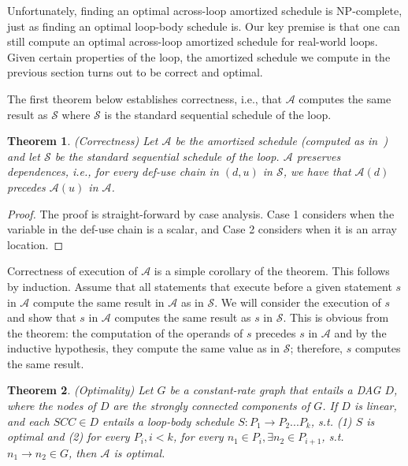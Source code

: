 \documentclass[sigconf, screen, natbib=false, dvipsnames, table]{acmart}
\newtheorem{theorem}{Theorem}
\theoremstyle{definition}
\begin{document}
Unfortunately, finding an optimal across-loop amortized schedule is NP-complete, just as finding an optimal loop-body schedule is.
Our key premise is that one can still compute an optimal across-loop amortized schedule for real-world loops. Given certain 
properties of the loop, the amortized schedule we compute in the previous section turns out to be correct and optimal. 

The first theorem below establishes correctness, i.e., that $\mathcal{A}$ computes the same result as $\mathcal{S}$ where
$\mathcal{S}$ is the standard sequential schedule of the loop. 

\begin{theorem}(Correctness)
Let $\mathcal{A}$ be the amortized schedule (computed as in~) and let $\mathcal{S}$ be the standard sequential 
schedule of the loop. $\mathcal{A}$ preserves dependences, i.e., for every def-use chain in $(d,u)$ in $\mathcal{S}$, we have that
$\mathcal{A}(d)$ precedes $\mathcal{A}(u)$ in $\mathcal{A}$.
\end{theorem}

\begin{proof}
The proof is straight-forward by case analysis. Case 1 considers when the variable in the def-use chain is a scalar, and Case 2 considers when 
it is an array location. 
\end{proof}

Correctness of execution of $\mathcal{A}$ is a simple corollary of the theorem. This follows by induction. Assume that all statements that 
execute before a given statement $s$ in $\mathcal{A}$ compute the same result in $\mathcal{A}$ as in $\mathcal{S}$. We will consider 
the execution of $s$ and show that $s$ in $\mathcal{A}$ computes the same result as $s$ in $\mathcal{S}$. This is obvious from the 
theorem: the computation of the operands of $s$ precedes $s$ in $\mathcal{A}$ and by the inductive hypothesis, they compute the
same value as in $\mathcal{S}$; therefore, $s$ computes the same result.


\begin{theorem}(Optimality)
Let $G$ be a constant-rate graph that entails a DAG $D$, where the nodes of $D$ are the strongly connected components of $G$. 
If $D$ is linear, and each $SCC \in D$ entails a loop-body schedule $S: P_1 \rightarrow P_2 ... P_k$, s.t. (1) $S$ is optimal 
and (2) for every $P_i, i<k$, for every $n_1 \in P_i, \exists n_2 \in P_{i+1}$, s.t. $n_1 \rightarrow n_2 \in G$, then $\mathcal{A}$ is optimal.
\end{theorem}
\end{document}

